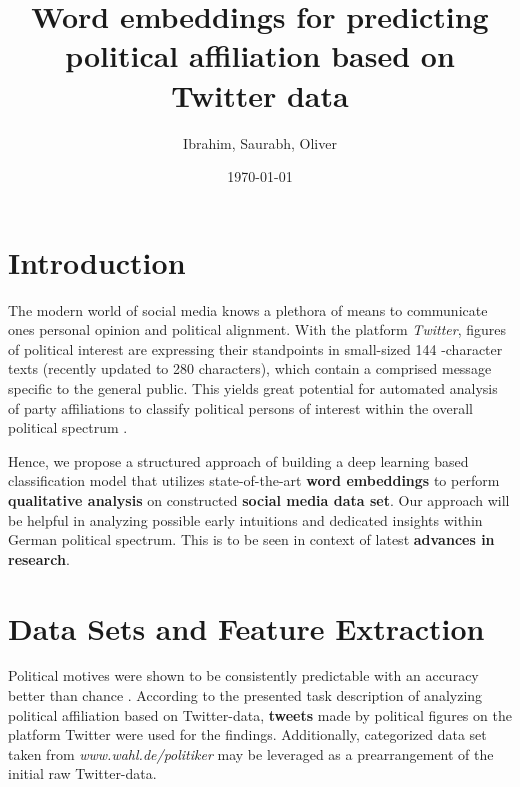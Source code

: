 \documentclass[final]{beamer}
\title
[Super Conference, 1 - 10 July 2013, New York, USA] %
{ %
Word embeddings for predicting political affiliation based on
Twitter data
}
\author{ %
Ibrahim, Saurabh, Oliver
}
\institute
[Technische Universität Kaiserslautern] %
{
\inst{1} Technische Universität Kaiserslautern\\[0.3ex]

}
\date{\today}
\begin{document}
\begin{frame}[t]
\begin{multicols}{3}

\section{Introduction}

The modern world of social media knows a plethora of means to communicate ones personal opinion and political alignment. With the platform \textit{Twitter}, figures of political interest are expressing their standpoints in small-sized 144 -character texts (recently updated to 280 characters), which contain a comprised message specific to the general public. This yields great potential for automated analysis of party affiliations to classify political persons of interest within the overall political spectrum \cite{Biessmann2017}.

Hence, we propose a structured approach of building a deep learning based classification model that utilizes state-of-the-art \textbf{word embeddings} \cite{Pelevinala2016} to perform \textbf{qualitative analysis} on constructed \textbf{social media data set}. Our approach will be helpful in analyzing possible early intuitions and dedicated insights within German political spectrum.
This is to be seen in context of latest \textbf{advances in research}.



\section{Data Sets and Feature Extraction}

Political motives were shown to be consistently predictable with an accuracy better than chance \cite{Biessmann2017}.
According to the presented task description of analyzing political affiliation based on Twitter-data, \textbf{tweets} made by political figures on the platform Twitter were used for the findings.
Additionally, categorized data set taken from \textit{www.wahl.de/politiker} may be leveraged as a prearrangement of the initial raw Twitter-data.


\end{multicols}
\end{frame}
\end{document}
